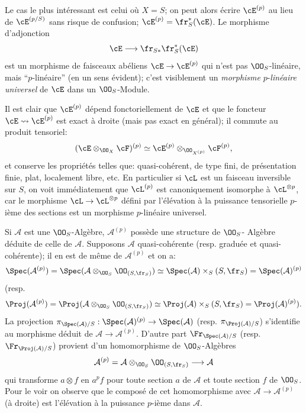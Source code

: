 Le cas le plus intéressant est celui où $X=S$; on peut alors écrire $\cE^{(p)}$ au lieu de $\cE^{(p/S)}$ sans risque de confusion; $\cE^{(p)}=\fr_S^*(\cE)$. Le morphisme d'adjonction
\[
\cE\longrightarrow \fr_{S*}\fr_S^*(\cE)
\]
est un morphisme de faisceaux abéliens $\cE\to\cE^{(p)}$ qui n'est pas $\OO_S$-linéaire, mais ``$p$-linéaire'' (en un sens évident); c'est visiblement un \emph{morphisme} $p$-\emph{linéaire universel} de $\cE$ dans un $\OO_S$-Module.

Il est clair que $\cE^{(p)}$ dépend fonctoriellement de $\cE$ et que le foncteur $\cE\rightsquigarrow\cE^{(p)}$ est exact à droite (mais pas exact en général); il commute au produit tensoriel:
\[
(\cE\otimes_{\OO_X}\cF)^{(p)}\simeq
\cE^{(p)}\otimes_{\OO_{X^{(p)}}}\cF^{(p)},
\]
et conserve les propriétés telles que: quasi-cohérent, de type fini, de présentation finie, plat, localement libre, etc. En particulier si $\cL$ est un faisceau inversible sur $S$, on voit immédiatement que $\cL^{(p)}$ est canoniquement isomorphe à $\cL^{\otimes p}$, car le morphisme $\cL\to\cL^{\otimes p}$ défini par l'élévation à la puissance tensorielle $p$-ième des sections est un morphisme $p$-linéaire universel.

Si $\mathcal{A}$ est une $\OO_S$-Algèbre, $\mathcal{A}^{(p)}$ possède une structure de $\OO_S$-
Algèbre déduite de celle de $\mathcal{A}$. Supposons $\mathcal{A}$ quasi-cohérente (resp. graduée et quasi-cohérente); il en est de même de $\mathcal{A}^{(p)}$ et on a:
\[
\Spec(\mathcal{A}^{(p)})=\Spec(\mathcal{A}\otimes_{\OO_S}\OO_{(S,\fr_S)})
 \simeq \Spec(\mathcal{A})\times_S(S,\fr_S)=\Spec(\mathcal{A})^{(p)}
\]
(resp.
\[
\Proj(\mathcal{A}^{(p)})=\Proj(\mathcal{A}\otimes_{\OO_S}\OO_{(S,\fr_S)})
 \simeq \Proj(\mathcal{A})\times_S(S,\fr_S)=\Proj(\mathcal{A})^{(p)}).
\]
La projection $\pi_{\Spec(\mathcal{A})/S}:\Spec(\mathcal{A})^{(p)}\to\Spec(\mathcal{A})$ (resp. $\pi_{\Proj(\mathcal{A})/S}$) s'identifie au morphisme déduit de $\mathcal{A}\to\mathcal{A}^{(p)}$. D'autre part $\Fr_{\Spec(\mathcal{A})/S}$ (resp. $\Fr_{\Proj(\mathcal{A})/S}$) provient d'un homomorphisme de $\OO_S$-Algèbres
\[
\mathcal{A}^{(p)}=\mathcal{A}\otimes_{\OO_S}\OO_{(S,\fr_S)}\longrightarrow \mathcal{A}
\]
qui transforme $a\otimes f$ en $a^p f$ pour toute section $a$ de $\mathcal{A}$ et toute section $f$ de $\OO_S$. Pour le voir on observe que le composé de cet homomorphisme avec $\mathcal{A}\to\mathcal{A}^{(p)}$ (à droite) est l'élévation à la puissance $p$-ième dans $\mathcal{A}$.

